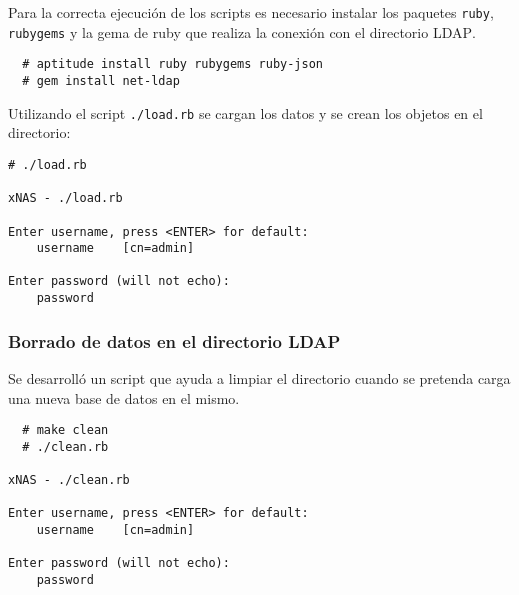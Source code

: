 Para la correcta ejecuci\'{o}n de los scripts es necesario instalar los paquetes \texttt{ruby}, \texttt{rubygems} y la gema de ruby que realiza la conexi\'{o}n con el directorio \textsc{LDAP}.

{
\scriptsize
\linespread{1}
\begin{verbatim}
  # aptitude install ruby rubygems ruby-json
  # gem install net-ldap
\end{verbatim}
}

Utilizando el script \texttt{./load.rb} se cargan los datos y se crean los objetos en el directorio:

{
\scriptsize
\linespread{1}
\begin{verbatim}
# ./load.rb

xNAS - ./load.rb

Enter username, press <ENTER> for default:
    username    [cn=admin]

Enter password (will not echo):
    password
\end{verbatim}
}


{
\begin{table}[H]
\caption{Script de carga de objetos en el directorio}{}
\label{tab:load-rb}
\noindent{} %
\end{table}
}

          \subsubsection {Borrado de datos en el directorio \textsc{LDAP}}

Se desarroll\'{o} un script que ayuda a limpiar el directorio cuando se pretenda carga una nueva base de datos en el mismo.

{
\scriptsize
\linespread{1}
\begin{verbatim}
  # make clean
  # ./clean.rb

xNAS - ./clean.rb

Enter username, press <ENTER> for default:
    username	[cn=admin]

Enter password (will not echo):
    password

\end{verbatim}
}

